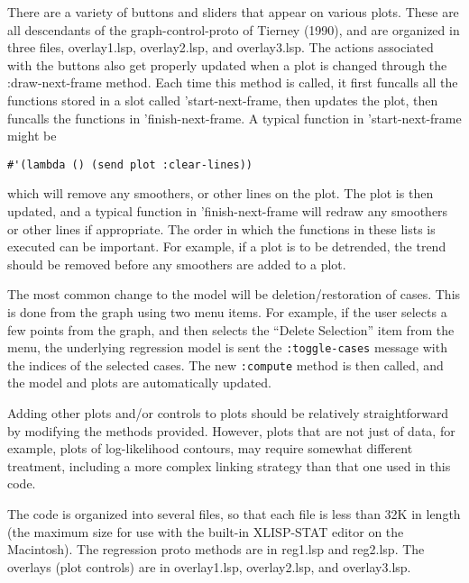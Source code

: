 There are a variety of buttons and sliders that appear on various plots.
These are all descendants of the graph-control-proto of Tierney (1990), and
are organized in three files, overlay1.lsp, overlay2.lsp,
and overlay3.lsp.  The actions
associated with the buttons also get properly updated when a plot is changed
through the :draw-next-frame method.  Each time this method is called, it first
funcalls all the functions stored in a slot called  'start-next-frame,
then updates the plot, then funcalls the functions in 
'finish-next-frame.  A typical function in 'start-next-frame might be

\begin{verbatim}
#'(lambda () (send plot :clear-lines))
\end{verbatim}
which will remove any smoothers, or other lines on the plot.  The plot is then
updated, and a typical function in 'finish-next-frame will redraw any
smoothers or other lines if appropriate.  The order in which the functions in
these lists is executed can be important.  For example, if a plot is to be
detrended, the trend should be removed before any smoothers are added to a
plot.

The most common change to the model will be deletion/restoration of cases.
This is done from the graph using two menu items.  For example, if the user
selects a few points from the graph, and then selects the ``Delete
Selection'' item from the menu, the underlying regression model is sent the
{\tt :toggle-cases} message with the indices of the selected cases.  The new
{\tt :compute} method is then called, and the model and plots are automatically
updated.

Adding other plots and/or controls to plots should be relatively
straightforward by modifying the methods provided.  However, plots that are
not just of data, for example, plots of log-likelihood contours, may require
somewhat different treatment, including a more complex linking strategy than
that one used in this code.

The code is organized into several files, so that each file is less than 32K
in length (the maximum size for use with the built-in XLISP-STAT editor on the
Macintosh).  The regression proto methods are in reg1.lsp and reg2.lsp.  The
overlays (plot controls) are in overlay1.lsp, overlay2.lsp, and overlay3.lsp.  

